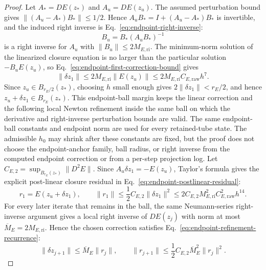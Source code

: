 \documentclass[preprint,12pt]{elsarticle}
\begin{document}
\begin{proof}
Let $A_\ast=D E(z_\ast)$ and $A_u=D E(z_u)$.  The assumed perturbation bound
gives $\|(A_u-A_\ast)B_\ast\|\le 1/2$.  Hence
$A_uB_\ast=I+(A_u-A_\ast)B_\ast$ is invertible, and the induced right inverse is
Eq.~\eqref{eq:endpoint-right-inverse}:
\begin{equation}
\label{eq:endpoint-right-inverse}
  B_u=B_\ast(A_uB_\ast)^{-1}
\end{equation}
is a right inverse for $A_u$ with $\|B_u\|\le 2M_{E,\mathrm{ri}}$.  The minimum-norm solution
of the linearized closure equation is no larger than the particular solution
$-B_uE(z_u)$, so Eq.~\eqref{eq:endpoint-first-correction-bound} gives
\begin{equation}
\label{eq:endpoint-first-correction-bound}
  \|\delta z_1\|\le 2M_{E,\mathrm{ri}}\|E(z_u)\|
  \le 2M_{E,\mathrm{ri}}C_{E,\mathrm{raw}}h^7 .
\end{equation}
Since \(z_u\in B_{r_E/2}(z_\ast)\), choosing \(h\) small enough gives
\(2\|\delta z_1\|<r_E/2\), and hence
\(z_u+\delta z_1\in B_{r_E}(z_\ast)\).
This endpoint-ball margin keeps the linear correction and the following
local Newton refinement inside the same ball on which the derivative and
right-inverse perturbation bounds are valid.
The same endpoint-ball constants and endpoint norm are used for every
retained-tube state. The admissible \(h_0\) may shrink after these constants
are fixed, but the proof does not choose the endpoint-anchor family, ball radius, or right inverse
from the computed endpoint correction or from a per-step projection log.
Let \(C_{E,2}=\sup_{B_{r_E}(z_\ast)}\|D^2E\|\).  Since
\(A_u\delta z_1=-E(z_u)\), Taylor's formula gives the explicit post-linear
closure residual in Eq.~\eqref{eq:endpoint-postlinear-residual}:
\begin{equation}
\label{eq:endpoint-postlinear-residual}
  r_1=E(z_u+\delta z_1),\qquad
  \|r_1\|\le \frac12 C_{E,2}\|\delta z_1\|^2
  \le 2C_{E,2}M_{E,\mathrm{ri}}^2C_{E,\mathrm{raw}}^2h^{14}.
\end{equation}
For every later iterate that remains in the ball, the same Neumann-series
right-inverse argument gives a local right inverse of \(D E(z_j)\) with norm
at most \(\overline M_E=2M_{E,\mathrm{ri}}\). Hence the chosen correction
satisfies Eq.~\eqref{eq:endpoint-refinement-recurrence}:
\begin{equation}
\label{eq:endpoint-refinement-recurrence}
  \|\delta z_{j+1}\|\le \overline M_E\|r_j\|,
  \qquad
  \|r_{j+1}\|\le \frac12 C_{E,2}\overline M_E^2\|r_j\|^2 .
\end{equation}

\end{proof}
\end{document}
